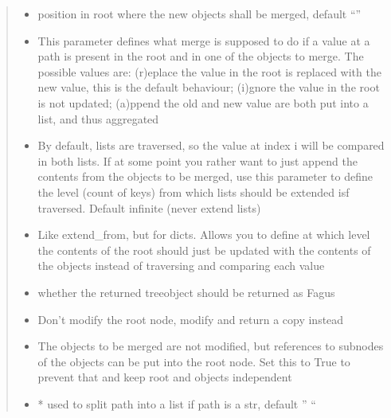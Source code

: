 \documentclass[a4paper,10pt,english]{sphinxmanual}
\begin{document}
\begin{fulllineitems}
\begin{fulllineitems}
\begin{quote}
\begin{description}
\begin{itemize}
\item {}
\sphinxAtStartPar
{} \textendash{} position in root where the new objects shall be merged, default “”

\item {}
\sphinxAtStartPar
{} \textendash{} This parameter defines what merge is supposed to do if a value at a path is present in the
root and in one of the objects to merge. The possible values are: (r)eplace \sphinxhyphen{} the value in the root is
replaced with the new value, this is the default behaviour; (i)gnore \sphinxhyphen{} the value in the root is not
updated; (a)ppend \sphinxhyphen{} the old and new value are both put into a list, and thus aggregated

\item {}
\sphinxAtStartPar
{} \textendash{} By default, lists are traversed, so the value at index i will be compared in both lists. If
at some point you rather want to just append the contents from the objects to be merged, use this
parameter to define the level (count of keys) from which lists should be extended isf traversed. Default
infinite (never extend lists)

\item {}
\sphinxAtStartPar
{} \textendash{} Like extend\_from, but for dicts. Allows you to define at which level the contents of the root
should just be updated with the contents of the objects instead of traversing and comparing each value

\item {}
\sphinxAtStartPar
{} \textendash{} whether the returned tree\sphinxhyphen{}object should be returned as Fagus

\item {}
\sphinxAtStartPar
{} \textendash{} Don’t modify the root node, modify and return a copy instead

\item {}
\sphinxAtStartPar
{} \textendash{} The objects to be merged are not modified, but references to subnodes of the objects can be
put into the root node. Set this to True to prevent that and keep root and objects independent

\item {}
\sphinxAtStartPar
{} \textendash{} * used to split path into a list if path is a str, default ” “


\end{itemize}
\end{description}
\end{quote}
\end{fulllineitems}
\end{fulllineitems}
\end{document}

